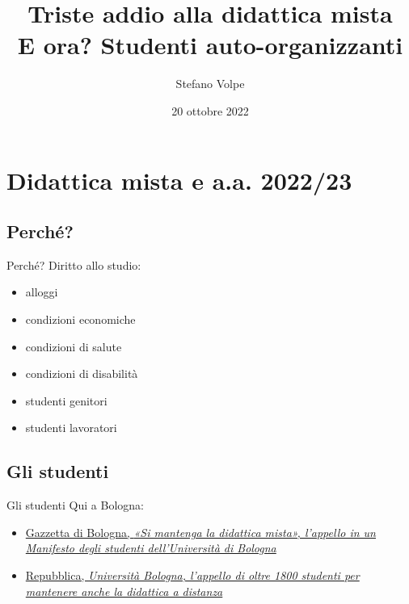 \documentclass{beamer}
\title{%
  Triste addio alla didattica mista \\
  \large E ora? Studenti auto-organizzanti
}
\author{Stefano Volpe}
\institute{FUCI Bologna}
\date{20 ottobre 2022}
\begin{document}
\begin{frame} 
  \titlepage
\end{frame}

\section{Didattica mista e a.a. 2022/23}

\subsection{Perché?}
\begin{frame}{Perché?}
  Diritto allo studio:
  \begin{itemize}
    \item<1-> alloggi
    \item<2-> condizioni economiche
    \item<3-> condizioni di salute
    \item<4-> condizioni di disabilità
    \item<5-> studenti genitori
    \item<6-> studenti lavoratori
  \end{itemize}
\end{frame}

\subsection{Gli studenti}
\begin{frame}{Gli studenti}
  Qui a Bologna:
  \begin{itemize}
    \item<1-> \href{https://gazzettadibologna.it/cultura/si-mantenga-la-didattica-mista-lappello-in-un-manifesto-degli-studenti-delluniversita-di-bologna/}{Gazzetta
      di Bologna, \emph{«Si mantenga la didattica mista»,
      l’appello in un Manifesto degli studenti dell’Università di Bologna}}
    \item<2-> \href{https://bologna.repubblica.it/cronaca/2022/06/12/news/universita_bologna_appello_studenti_didattica_a_distanza-353548244/}{Repubblica,
      \emph{Università Bologna, l'appello di oltre 1800 studenti per mantenere anche la didattica a distanza}}
  \end{itemize}
\end{frame}
\end{document}
